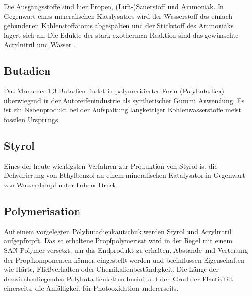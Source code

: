             Die Ausgangsstoffe sind hier Propen, (Luft-)Sauerstoff und Ammoniak. In Gegenwart eines mineralischen Katalysators wird der Wasserstoff
            des einfach gebundenen Kohlenstoffatoms abgespalten und der Stickstoff des Ammoniaks lagert sich an. Die Edukte der
            stark exothermen Reaktion sind das gewünschte Acrylnitril und Wasser \cite{sohio.process.patent.1959.9201957}.

        \subsection*{Butadien}
            Das Monomer 1,3-Butadien findet in polymerisierter Form (Polybutadien) überwiegend in der Autoreifenindustrie als synthetischer Gummi
            Anwendung. Es ist ein Nebenprodukt bei der Aufspaltung langkettiger Kohlenwasserstoffe meist fossilen Ursprungs.

        \subsection*{Styrol}
            Eines der heute wichtigsten Verfahren zur Produktion von Styrol ist die Dehydrierung von Ethylbenzol
            an einem mineralischen Katalysator in Gegenwart von Wasserdampf unter hohem Druck \cite{styrol.synthese.Liquid.Phase.Alkylation.of.Benzene.Bellussi.1995}.

        \subsection{Polymerisation}
            Auf einem vorgelegten Polybutadienkautschuk werden Styrol und Acrylnitril aufgepfropft. Das so erhaltene Propfpolymerisat
            wird in der Regel mit einem SAN-Polymer versetzt, um das Endprodukt zu erhalten. Abstände und Verteilung der
            Propfkomponenten können eingestellt werden und beeinflussen Eigenschaften wie Härte, Fließverhalten oder
            Chemikalienbeständigkeit. Die Länge der dazwischenliegenden Polybutadienketten beeinflusst den Grad der Elastizität
            einerseits, die Anfälligkeit für Photooxidation andererseits\cite{Domininghaus.1998.Kunststoffe.und.ihre.Eigenschaften}.
        
